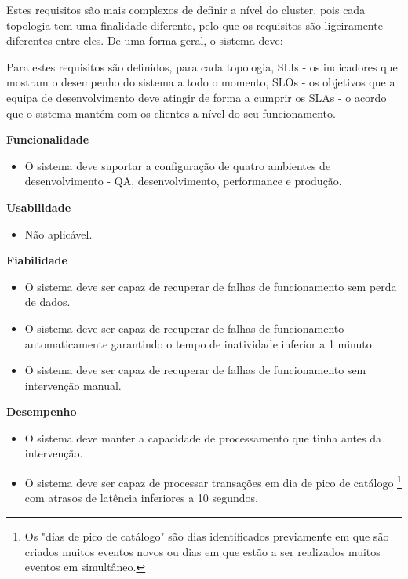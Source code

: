 Estes requisitos são mais complexos de definir a nível do \gls{cluster}, pois cada topologia tem 
uma finalidade diferente, pelo que os requisitos são ligeiramente diferentes entre eles. De uma
forma geral, o sistema deve:

Para estes requisitos são definidos, para cada topologia, \acp{SLI} - os indicadores que mostram o
desempenho do sistema a todo o momento, \acp{SLO} - os objetivos que a equipa de desenvolvimento
deve atingir de forma a cumprir os \acp{SLA} - o acordo que o sistema mantém com os clientes a 
nível do seu funcionamento.

\vspace{5mm}

\textbf{Funcionalidade}
\begin{itemize}
  \item O sistema deve suportar a configuração de quatro ambientes de desenvolvimento - \ac{QA}, 
    desenvolvimento, performance e produção.
\end{itemize}

\textbf{Usabilidade}
\begin{itemize}
  \item Não aplicável.
\end{itemize}

\textbf{Fiabilidade}

\begin{itemize}
  \item O sistema deve ser capaz de recuperar de falhas de funcionamento sem perda de dados.
  \item O sistema deve ser capaz de recuperar de falhas de funcionamento automaticamente garantindo 
    o tempo de inatividade inferior a 1 minuto.
  \item O sistema deve ser capaz de recuperar de falhas de funcionamento sem intervenção manual.
\end{itemize}

\textbf{Desempenho}
\begin{itemize}
  \item O sistema deve manter a capacidade de processamento que tinha antes da intervenção.
  \item O sistema deve ser capaz de processar transações em dia de pico de catálogo \footnote[1]{
    Os "dias de pico de catálogo" são dias identificados previamente em que são criados muitos 
    eventos novos ou dias em que estão a ser realizados muitos eventos em simultâneo.}
    com atrasos de latência inferiores a 10 segundos.
\end{itemize}

